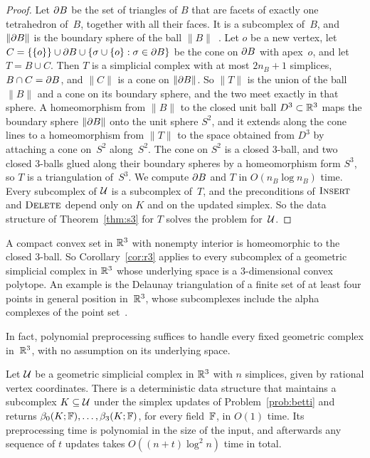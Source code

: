 \begin{proof}
Let $\partial B$ be the set of triangles of $B$ that are facets of exactly one tetrahedron of~$B$, together with all their faces.
It is a subcomplex of~$B$, and $\lVert\partial B\rVert$ is the boundary sphere of the ball $\lVert B\rVert$~\cite{Mun84}.
Let $o$ be a new vertex, let $C=\{\{o\}\}\cup\partial B\cup\{\sigma\cup\{o\}:\sigma\in\partial B\}$ be the cone on $\partial B$ with apex~$o$, and let $T=B\cup C$.
Then $T$ is a simplicial complex with at most $2n_B+1$ simplices, $B\cap C=\partial B$, and $\lVert C\rVert$ is a cone on $\lVert\partial B\rVert$.
So $\lVert T\rVert$ is the union of the ball $\lVert B\rVert$ and a cone on its boundary sphere, and the two meet exactly in that sphere.
A homeomorphism from $\lVert B\rVert$ to the closed unit ball $D^3\subset\mathbb{R}^3$ maps the boundary sphere $\lVert\partial B\rVert$ onto the unit sphere $S^2$, and it extends along the cone lines to a homeomorphism from $\lVert T\rVert$ to the space obtained from $D^3$ by attaching a cone on~$S^2$ along~$S^2$.
The cone on $S^2$ is a closed $3$-ball, and two closed $3$-balls glued along their boundary spheres by a homeomorphism form $S^3$, so $T$ is a triangulation of~$S^3$.
We compute $\partial B$ and $T$ in $O(n_B\log n_B)$ time.
Every subcomplex of $\mathcal{U}$ is a subcomplex of~$T$, and the preconditions of $\textsc{Insert}$ and $\textsc{Delete}$ depend only on $K$ and on the updated simplex.
So the data structure of Theorem~\ref{thm:s3} for $T$ solves the problem for~$\mathcal{U}$.
\end{proof}

A compact convex set in $\mathbb{R}^3$ with nonempty interior is homeomorphic to the closed $3$-ball.
So Corollary~\ref{cor:r3} applies to every subcomplex of a geometric simplicial complex in $\mathbb{R}^3$ whose underlying space is a $3$-dimensional convex polytope.
An example is the Delaunay triangulation of a finite set of at least four points in general position in~$\mathbb{R}^3$, whose subcomplexes include the alpha complexes of the point set~\cite{EH10}.

In fact, polynomial preprocessing suffices to handle every fixed geometric complex in~$\mathbb{R}^3$, with no assumption on its underlying space.

\begin{corollary}\label{cor:anyR3}
Let $\mathcal{U}$ be a geometric simplicial complex in $\mathbb{R}^3$ with $n$ simplices, given by rational vertex coordinates.
There is a deterministic data structure that maintains a subcomplex $K\subseteq\mathcal{U}$ under the simplex updates of Problem~\ref{prob:betti} and returns $\beta_0(K;\mathbb{F}),\dots,\beta_3(K;\mathbb{F})$, for every field~$\mathbb{F}$, in $O(1)$ time.
Its preprocessing time is polynomial in the size of the input, and afterwards any sequence of $t$ updates takes $O((n+t)\log^2n)$ time in total.
\end{corollary}

